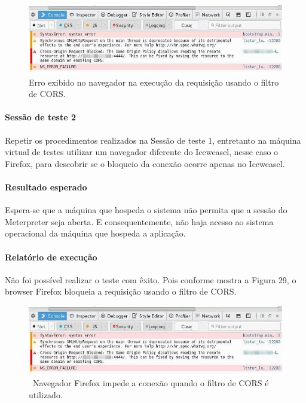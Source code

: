 \documentclass[
    12pt,               %
    openright,          %
    oneside,            %
    a4paper,            %
    section=TITLE,     %
    english,            %
    french,             %
    spanish,            %
    brazil              %
    ]{abntex2}
\newcommand{\citep}{\cite}
\begin{document}
\begin{figure}[htp]
\centering
\caption{Erro exibido no navegador na execução da requisição usando o filtro de CORS.}
\includegraphics[width=450px]{image26.jpeg}
\end{figure}
\ifdefined\FloatBarrier \FloatBarrier \fi





\paragraph*{Sessão de teste 2}

Repetir os procedimentos realizados na Sessão de teste 1, entretanto na máquina virtual de testes utilizar um navegador diferente do Iceweasel, nesse caso o Firefox, para descobrir se o bloqueio da conexão ocorre apenas no Iceweasel.



\paragraph*{Resultado esperado}

Espera-se que a máquina que hospeda o sistema não permita que a sessão do Meterpreter seja aberta. E consequentemente, não haja acesso ao sistema operacional da máquina que hospeda a aplicação.



\paragraph*{Relatório de execução}

Não foi possível realizar o teste com êxito. Pois conforme mostra a Figura 29, o browser Firefox bloqueia a requisição usando o filtro de CORS.\citep{62210}~~





\begin{figure}[htp]
\centering
\caption{~Navegador Firefox impede a conexão quando o filtro de CORS é utilizado.}
\includegraphics[width=450px]{image26.jpeg}
\end{figure}
\ifdefined\FloatBarrier \FloatBarrier \fi
\end{document}
